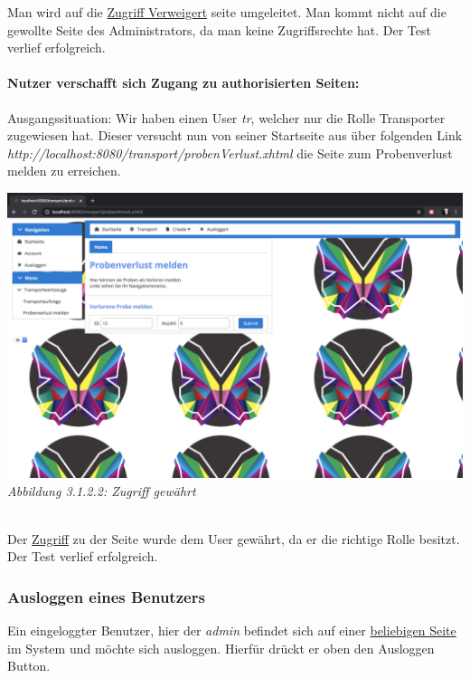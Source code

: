 \documentclass[enabledeprecatedfontcommands,fontsize=12pt,paper=a4,twoside]{scrartcl}
\begin{document}
Man wird auf die \hyperlink{sc3.1.2.1.1}{Zugriff Verweigert} seite umgeleitet. Man kommt nicht auf die gewollte Seite des Administrators, da man keine Zugriffsrechte hat. 
Der Test verlief erfolgreich.

%
\paragraph{Nutzer verschafft sich Zugang zu authorisierten Seiten:}

Ausgangssituation: Wir haben einen User \textit{tr}, welcher nur die Rolle Transporter zugewiesen hat. Dieser versucht nun von seiner Startseite aus über folgenden Link \textit{http://localhost:8080/transport/probenVerlust.xhtml} die Seite zum Probenverlust melden zu erreichen. 

\hypertarget{sc3.1.2.2.1}{
\includegraphics[width=1\textwidth]{Screenshots/3122.png}
\textit{Abbildung 3.1.2.2: Zugriff gewährt}
} \\

Der  \hyperlink{sc3.1.2.1.1}{Zugriff} zu der Seite wurde dem User gewährt, da er die richtige Rolle besitzt. Der Test verlief erfolgreich. 


\subsubsection{Ausloggen eines Benutzers}

Ein eingeloggter Benutzer, hier der \textit{admin} befindet sich auf einer \hyperlink{sc3.1.3.1.1}{beliebigen Seite} im System und möchte sich ausloggen. Hierfür drückt er oben den Ausloggen Button. 
\end{document}

